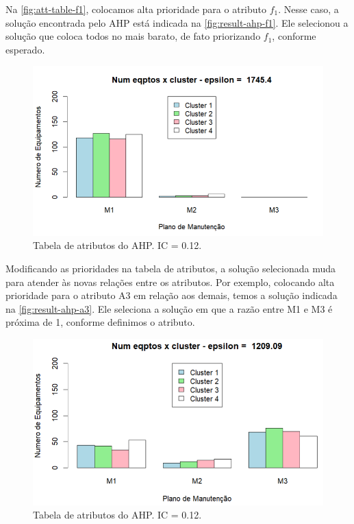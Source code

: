 \documentclass[conference]{IEEEtran}
\begin{document}
Na \autoref{fig:att-table-f1}, colocamos alta prioridade para o atributo $f_1$.
Nesse caso, a solução encontrada pelo AHP está indicada na \autoref{fig:result-ahp-f1}.
Ele selecionou a solução que coloca todos no mais barato, de fato priorizando $f_1$, conforme
esperado.

\begin{figure}[htbp]
    \centering
    \includegraphics[width=\columnwidth,trim=1 1 1 1,clip]{../images/result-ahp-f1.png}
    \caption{\label{fig:result-ahp-f1}
	Tabela de atributos do AHP. IC = 0.12.}
\end{figure}

Modificando as prioridades na tabela de atributos, a solução selecionada muda para atender 
às novas relações entre os atributos. Por exemplo, colocando alta prioridade para o atributo A3 
em relação aos demais, temos a solução indicada na \autoref{fig:result-ahp-a3}. Ele seleciona a solução 
em que a razão entre M1 e M3 é próxima de 1, conforme definimos o atributo.

\begin{figure}[htbp]
    \centering
    \includegraphics[width=\columnwidth,trim=1 1 1 1,clip]{../images/result-ahp-a3.png}
    \caption{\label{fig:result-ahp-a3}
	Tabela de atributos do AHP. IC = 0.12.}
\end{figure}
\end{document}
